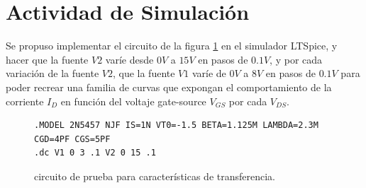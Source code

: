 \section{Actividad de Simulación}
    Se propuso implementar el circuito de la figura \ref{crkt:jfet-transf} en el simulador LTSpice, y hacer que la fuente
    $V2$ varíe desde $0V$ a $15V$ en pasos de $0.1V$, y por cada variación de la fuente $V2$, que la fuente $V1$ varíe de
    $0V$ a $8V$ en pasos de $0.1V$ para poder recrear una familia de curvas que expongan el comportamiento de la
    corriente $I_D$ en función del voltaje gate-source $V_{GS}$ por cada $V_{DS}$.
    \begin{figure}[!ht]
      \centering
      \begin{minipage}{0.45\textwidth}
        \caption{circuito de prueba para características de transferencia.}
        \label{crkt:jfet-transf}
      \end{minipage}
      \hfill
      \begin{minipage}{0.45\textwidth}
        \begin{lstlisting}[style=ltspice, caption={Parámetros de simulación LTspice}, label=list:jfet-transf]
.MODEL 2N5457 NJF IS=1N VT0=-1.5 BETA=1.125M LAMBDA=2.3M CGD=4PF CGS=5PF
.dc V1 0 3 .1 V2 0 15 .1
        \end{lstlisting}
      \end{minipage}
    \end{figure}

